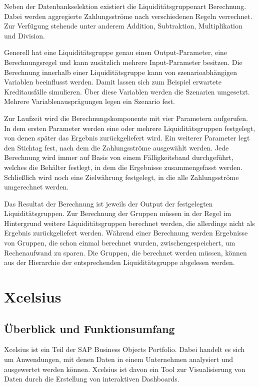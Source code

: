\begin{onehalfspacing}
Neben der Datenbankselektion existiert die Liquiditätsgruppenart Berechnung. Dabei werden aggregierte Zahlungsströme nach verschiedenen Regeln verrechnet. Zur Verfügung stehende unter anderem Addition, Subtraktion, Multiplikation und Division. 

Generell hat eine Liquiditätsgruppe genau einen Output-Parameter, eine Berechnungsregel und kann zusätzlich mehrere Input-Parameter besitzen. Die Berechnung innerhalb einer Liquiditätsgruppe kann von szenarioabhängigen Variablen beeinflusst werden. Damit lassen sich zum Beispiel erwartete Kreditausfälle simulieren. Über diese Variablen werden die Szenarien umgesetzt. Mehrere Variablenausprägungen legen ein Szenario fest.


\label{sec:berechnungskomponente:parameter}
Zur Laufzeit wird die Berechnungskomponente mit vier Parametern aufgerufen. In dem ersten Parameter werden eine oder mehrere Liquiditätsgruppen festgelegt, von denen später das Ergebnis zurückgeliefert wird. Ein weiterer Parameter legt den Stichtag fest, nach dem die Zahlungsströme ausgewählt werden. Jede Berechnung wird immer auf Basis von einem Fälligkeitsband durchgeführt, welches die Behälter festlegt, in dem die Ergebnisse zusammengefasst werden. Schließlich wird noch eine Zielwährung festgelegt, in die alle Zahlungsströme umgerechnet werden.

Das Resultat der Berechnung ist jeweils der Output der festgelegten Liquiditätsgruppen. Zur Berechnung der Gruppen müssen in der Regel im Hintergrund weitere Liquiditätsgruppen berechnet werden, die allerdings nicht als Ergebnis zurückgeliefert werden. Während einer Berechnung werden Ergebnisse von Gruppen, die schon einmal berechnet wurden, zwischengespeichert, um Rechenaufwand zu sparen. Die Gruppen, die berechnet werden müssen, können aus der Hierarchie der entsprechenden Liquiditätsgruppe abgelesen werden.

\section{Xcelsius}
\label{sec:xcelsius}
\subsection{Überblick und Funktionsumfang} %
Xcelsius ist ein Teil der SAP Business Objects Portfolio. Dabei handelt es sich um Anwendungen, mit denen Daten in einem Unternehmen analysiert und ausgewertet werden können. Xcelsius ist davon ein Tool zur Visualisierung von Daten durch die Erstellung von interaktiven Dashboards.


\end{onehalfspacing}
